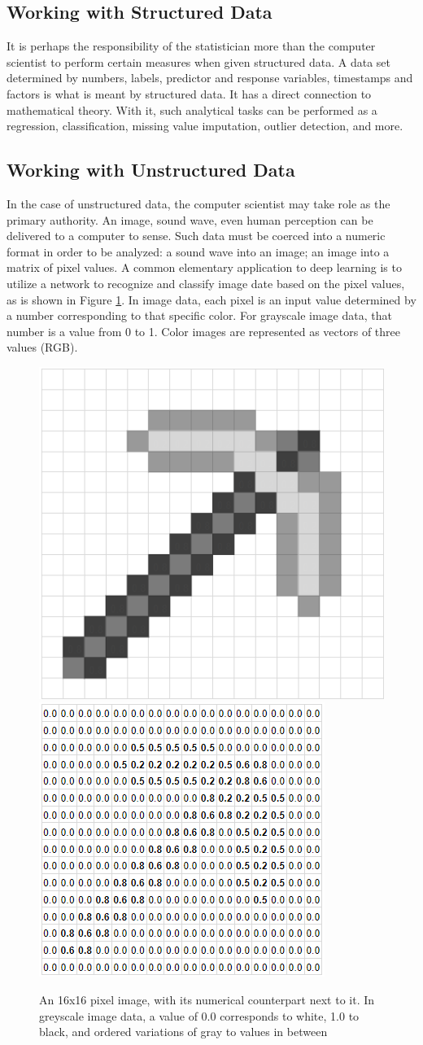 \subsection{Working with Structured Data} %

It is perhaps the responsibility of the statistician more than the computer scientist to perform certain measures when given structured data.  A data set determined by numbers, labels, predictor and response variables, timestamps and factors is what is meant by structured data.  It has a direct connection to mathematical theory.  With it, such analytical tasks can be performed as a regression, classification, missing value imputation, outlier detection, and more.


\subsection{Working with Unstructured Data} %

In the case of unstructured data, the computer scientist may take role as the primary authority.  An image, sound wave, even human perception \cite{anbarasan2022human} can be delivered to a computer to sense.  Such data must be coerced into a numeric format in order to be analyzed: a sound wave into an image; an image into a matrix of pixel values.  A common elementary application to deep learning is to utilize a network to recognize and classify image date based on the pixel values, as is shown in Figure \ref{minecraft}.  In image data, each pixel is an input value determined by a number corresponding to that specific color.  For grayscale image data, that number is a value from 0 to 1.  Color images are represented as vectors of three values (RGB).

\begin{figure}[H]
    \centering
    \includegraphics[width=.2\textwidth]{Figures/pickaxe_1.png}
    \hspace{60pt}
    \includegraphics[width=.5\textwidth]{Figures/pickaxe_2.png}
    \caption{\footnotesize{An 16x16 pixel image, with its numerical counterpart next to it.  In greyscale image data, a value of 0.0 corresponds to white, 1.0 to black, and ordered variations of gray to values in between}}
    \label{minecraft}
\end{figure}

